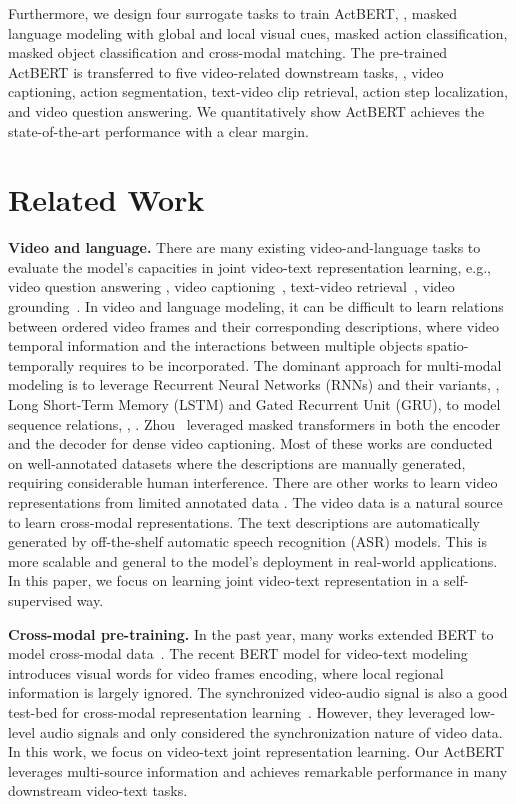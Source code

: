 \documentclass[10pt,twocolumn,letterpaper]{article}
\newcommand{\ours}{ActBERT\xspace}
\begin{document}
Furthermore, we design four surrogate tasks to train \ours, \ie, masked language modeling with global and local visual cues, masked action classification, masked object classification and cross-modal matching. The pre-trained \ours is transferred to five video-related downstream tasks, \ie, video captioning, action segmentation, text-video clip retrieval, action step localization, and video question answering.
We quantitatively show \ours achieves the state-of-the-art performance with a clear margin.


\section{Related Work}
\noindent\textbf{Video and language.}
There are many existing video-and-language tasks to evaluate the model's capacities in joint video-text representation learning, e.g., video question answering \cite{tapaswi2016movieqa,jang2017tgif,lei2018tvqa,zhu2017uncovering}, video captioning~\cite{yao2015describing,zhou2018end}, text-video retrieval~\cite{yu2018joint,wang2019learning,miech2018learning}, video grounding~\cite{zhou2019grounded}.
In video and language modeling, it can be difficult to learn relations between ordered video frames and their corresponding descriptions, where video temporal information and the interactions between multiple objects spatio-temporally requires to be incorporated. The dominant approach for multi-modal modeling is to leverage Recurrent Neural Networks (RNNs) and their variants, \eg, Long Short-Term Memory (LSTM) and Gated Recurrent Unit (GRU), to model sequence relations, \eg, \cite{pan2016jointly,zhu2017bidirectional}. Zhou~\etal\cite{zhou2018end} leveraged masked transformers in both the encoder and the decoder for dense video captioning.
Most of these works are conducted on well-annotated datasets where the descriptions are manually generated, requiring considerable human interference. 
There are other works to learn video representations from limited annotated data \cite{zhu2018compound}.
The video data is a natural source to learn cross-modal representations. The text descriptions are automatically generated by off-the-shelf automatic speech recognition (ASR) models. This is more scalable and general to the model's deployment in real-world applications.
In this paper, we focus on learning joint video-text representation in a self-supervised way. 

\noindent\textbf{Cross-modal pre-training.}
In the past year, many works extended BERT to model cross-modal data~\cite{lu2019vilbert,su2019vl,tan2019lxmert,chen2019uniter,li2019unicoder,sun2019videobert}. The recent BERT model for video-text modeling~\cite{sun2019videobert} introduces visual words for video frames encoding, where local regional information is largely ignored.
The synchronized video-audio signal is also a good test-bed for cross-modal representation learning~\cite{arandjelovic2018objects,korbar2018cooperative}. However, they leveraged low-level audio signals and only considered  the synchronization nature of video data. In this work, we focus on video-text joint representation learning. Our \ours leverages multi-source information and achieves remarkable performance in many downstream  video-text tasks.
\end{document}
